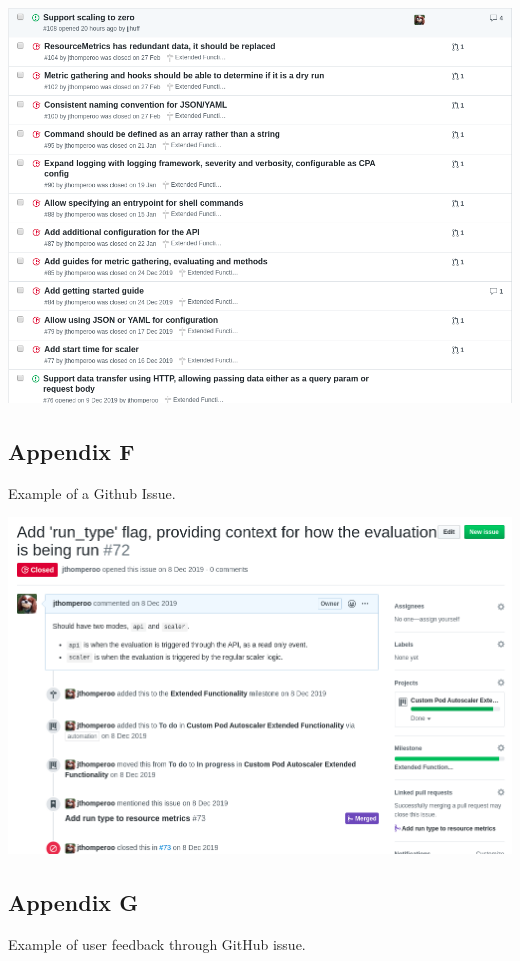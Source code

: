\includegraphics[width=1.0\textwidth]{assets/implementation/gh_issues.png}
\newpage

\subsection*{Appendix F}

Example of a Github Issue.

\includegraphics[width=1.0\textwidth]{assets/implementation/gh_issue_example.png}
\newpage

\subsection*{Appendix G}

Example of user feedback through GitHub issue.

